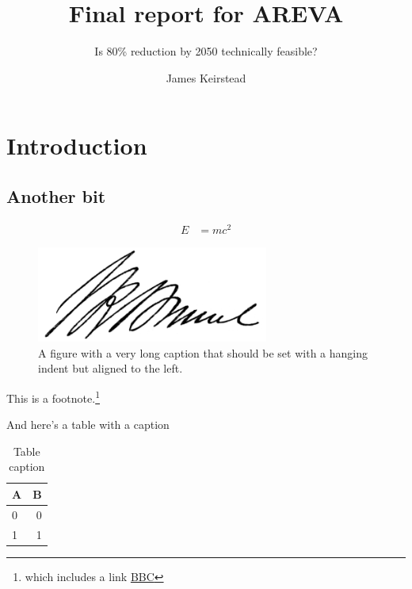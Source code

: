 \documentclass[a4paper, vc]{impreport}
\title{Final report for AREVA}
\subtitle{Is 80\% reduction by 2050 technically feasible?}
\author{James Keirstead}
\begin{document}
\begin{titlingpage}
  \maketitle
\end{titlingpage}

\chapter{Introduction}

\lipsum[1]

\section{Another bit}
\lipsum[2]

\begin{align*}
E &= mc^2
\end{align*}

\begin{figure}[htbp]
  \includegraphics[width=3in]{Isambard_Kingdom_Brunel_signature.png}
  \caption{A figure with a very long caption that should be set with a hanging indent but aligned to the left.}
\end{figure}

This is a footnote.\footnote{which includes a link \href{http://www.bbc.co.uk}{BBC}}

And here's a table with a caption
\begin{table}[htbp]
  \centering
  \begin{tabular}{lr}
    \toprule
    A & B \\
    \midrule
    0 & 0 \\
    1 & 1 \\
    \bottomrule
  \end{tabular}
  \caption{Table caption}
\end{table}
\end{document}
